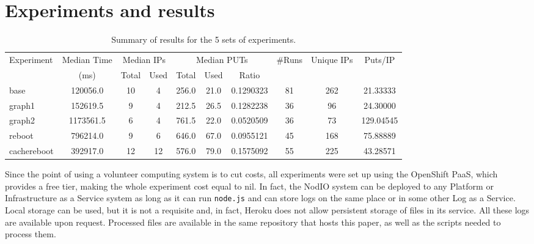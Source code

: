 \documentclass[runningheads,a4paper]{llncs}\usepackage[]{graphicx}\usepackage[]{color}
\begin{document}
\section{Experiments and results} 
\label{sec:experiments}

\begin{table}[htb]
\caption{Summary of results for the 5 sets of experiments.\label{tab:runs}}
\begin{center}
\begin{tabular}{|l|c|c|c|c|c|c|c|c|c|}
\hline
Experiment & Median Time & \multicolumn{2}{|c|}{Median IPs} &
\multicolumn{3}{|c|}{Median PUTs} & \#Runs & Unique IPs & Puts/IP \\
           &   (ms)        & Total & Used & Total & Used & Ratio &  & & \\
\hline
base & 120056.0 & 10 & 4 & 256.0 & 21.0 & 0.1290323 & 81 & 262 & 21.33333\\
\hline
graph1 & 152619.5 & 9 & 4 & 212.5 & 26.5 & 0.1282238 & 36 & 96 & 24.30000\\

graph2 & 1173561.5 & 6 & 4 & 761.5 & 22.0 & 0.0520509 & 36 & 73 & 129.04545\\
\hline
reboot & 796214.0 & 9 & 6 & 646.0 & 67.0 & 0.0955121 & 45 & 168 & 75.88889\\
\hline
cachereboot & 392917.0 & 12 & 12 & 576.0 & 79.0 & 0.1575092 & 55 & 225 & 43.28571\\
\hline
\end{tabular}
\end{center}
\end{table}
%
%
%
Since the point of using a volunteer computing system is to cut costs, %
all experiments were set up using the OpenShift
PaaS, which provides a free tier, making the whole experiment cost
equal to nil. In fact, the NodIO system can be deployed to any
Platform or Infrastructure as a Service 
system as long as it can run \texttt{node.js} and can store logs on the same
place or in some other Log as a Service. Local storage can be used,
but it is not a requisite and, in fact, Heroku %
 does not allow
persistent storage of files in its service. 
All these logs are available upon
request. Processed files are available in the same repository that
hosts this paper, as well as the scripts needed to process them. 
\end{document}
